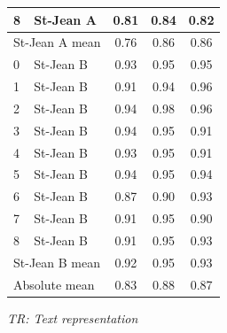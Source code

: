 \begin{table}
{\begin{tabular}{l l c c c}
    8 & St-Jean A & 0.81 & 0.84 & 0.82 \\
    \midrule
    \multicolumn{2}{l}{St-Jean A mean} & 0.76 & 0.86 & 0.86 \\
    \midrule
    0 & St-Jean B & 0.93 & 0.95 & 0.95 \\
    1 & St-Jean B & 0.91 & 0.94 & 0.96 \\
    2 & St-Jean B & 0.94 & 0.98 & 0.96 \\
    3 & St-Jean B & 0.94 & 0.95 & 0.91 \\
    4 & St-Jean B & 0.93 & 0.95 & 0.91 \\
    5 & St-Jean B & 0.94 & 0.95 & 0.94 \\
    6 & St-Jean B & 0.87 & 0.90 & 0.93 \\
    7 & St-Jean B & 0.91 & 0.95 & 0.90 \\
    8 & St-Jean B & 0.91 & 0.95 & 0.93 \\
    \midrule
    \multicolumn{2}{l}{St-Jean B mean} & 0.92 & 0.95 & 0.93 \\
    \midrule
    \multicolumn{2}{l}{Absolute mean} & 0.83 & 0.88 & 0.87 \\
    \bottomrule
  \end{tabular}
  }

  \vspace{0.2cm}

  \textit{TR: Text representation}
\end{table}

